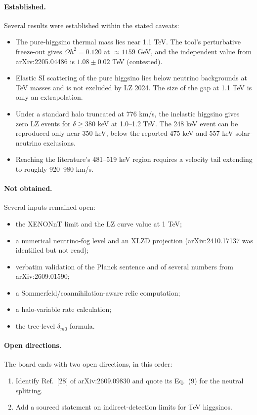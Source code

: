 \documentclass[11pt,a4paper]{article}
\begin{document}
\paragraph{Established.} Several results were established within the stated caveats:
\begin{itemize}
\item The pure-higgsino thermal mass lies near 1.1 TeV. The tool's perturbative freeze-out gives $\Omega h^2=0.120$ at $\approx1159$ GeV, and the independent value from arXiv:2205.04486 is $1.08\pm0.02$ TeV (contested).
\item Elastic SI scattering of the pure higgsino lies below neutrino backgrounds at TeV masses and is not excluded by LZ 2024. The size of the gap at 1.1 TeV is only an extrapolation.
\item Under a standard halo truncated at 776 km/s, the inelastic higgsino gives zero LZ events for $\delta\geq380$ keV at 1.0--1.2 TeV. The 248 keV event can be reproduced only near 350 keV, below the reported 475 keV and 557 keV solar-neutrino exclusions.
\item Reaching the literature's 481--519 keV region requires a velocity tail extending to roughly 920--980 km/s.
\end{itemize}

\paragraph{Not obtained.} Several inputs remained open:
\begin{itemize}
\item the XENONnT limit and the LZ curve value at 1 TeV;
\item a numerical neutrino-fog level and an XLZD projection (arXiv:2410.17137 was identified but not read);
\item verbatim validation of the Planck sentence and of several numbers from arXiv:2609.01590;
\item a Sommerfeld/coannihilation-aware relic computation;
\item a halo-variable rate calculation;
\item the tree-level $\delta_{m0}$ formula.
\end{itemize}

\paragraph{Open directions.} The board ends with two open directions, in this order:
\begin{enumerate}
\item Identify Ref.~[28] of arXiv:2609.09830 and quote its Eq.~(9) for the neutral splitting.
\item Add a sourced statement on indirect-detection limits for TeV higgsinos.
\end{enumerate}
\end{document}
